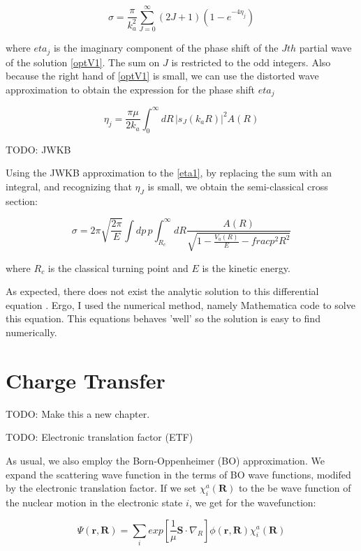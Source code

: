 \begin{equation}
\sigma = \frac{\pi}{k_a^2}\sum_{J=0}^{\infty}{(2J+1)\left(1-e^{-4\eta_j}\right) }
\end{equation}

where $ eta_j $ is the imaginary component of the phase shift of the $ Jth $ partial wave of the solution \eqref{optV1}. The sum on $ J $ is restricted to the odd integers. 
Also because the right hand of \eqref{optV1} is small, we can use the distorted wave approximation to obtain the expression for the phase shift $ eta_j $

\begin{equation}\label{eta1}
\eta_j = \frac{\pi\mu}{2k_a}\int_0^{\infty}{dR\,\left|s_J\left(k_aR\right)\right|^2A(R) }
\end{equation}

TODO: JWKB

Using the JWKB approximation to the \eqref{eta1}, by replacing the sum with an integral, and recognizing that $ \eta_J $ is small, we obtain the semi-classical cross section:

\begin{equation}\label{sccs}
\sigma = 2\pi\sqrt{\frac{2\pi}{E}}\int{dp\,p}\int_{R_c}^{\infty}{dR \frac{A(R)}{\sqrt{1-\frac{V_a(R)}{E}-frac{p^2}{R^2}}}}
\end{equation}

where $ R_c $ is the classical turning point and $ E $ is the kinetic energy.

As expected, there does not exist the analytic solution to this  differential equation . Ergo, I used the numerical method, namely Mathematica code to solve this equation. This equations behaves  'well' so the solution is easy to find numerically. 

\section{Charge Transfer}

TODO: Make this a new chapter.

TODO: Electronic translation factor (ETF) 

As usual, we also employ the Born-Oppenheimer (BO) approximation. We expand the scattering wave function in the terms of BO wave functions, modifed by the electronic translation factor. 
If we set $ \chi_i^a(\mathbf{R}) $ to the be wave function of the nuclear motion in the electronic state $ i $, we get for the wavefunction:

\begin{equation}
\Psi(\mathbf{r},\mathbf{R}) = \sum_i{exp\left[\frac{1}{\mu}\mathbf{S}\cdot\nabla_R \right]\phi(\mathbf{r},\mathbf{R}) }\chi_i^a(\mathbf{R})
\end{equation}

